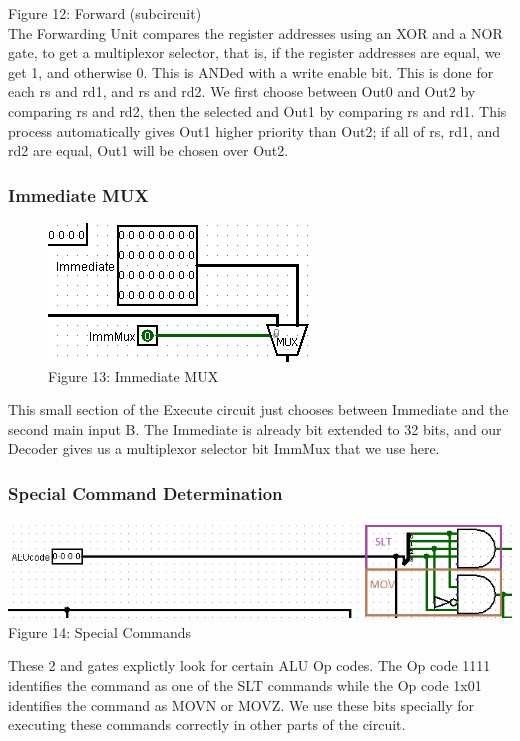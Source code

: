 \documentclass{article}
\begin{document}
\hspace{1.5cm}Figure 12: Forward (subcircuit) \\

\noindent The Forwarding Unit compares the register addresses using an XOR and a NOR gate, to get a multiplexor selector, that is, if the register addresses are equal, we get 1, and otherwise 0. This is ANDed with a write enable bit. This is done for each rs and rd1, and rs and rd2. We first choose between Out0 and Out2 by comparing rs and rd2, then the selected and Out1 by comparing rs and rd1. This process automatically gives Out1 higher priority than Out2; if all of rs, rd1, and rd2 are equal, Out1 will be chosen over Out2. 

\subsubsection{Immediate MUX}
\begin{figure}
\vspace{-1.8cm}
\begin{center}
\includegraphics[scale=0.8]{Immediate.png}\\
Figure 13: Immediate MUX
\end{center}
\vspace{-1cm}
\end{figure}
This small section of the Execute circuit just chooses between Immediate and the second main input B. The Immediate is already bit extended to 32 bits, and our Decoder gives us a multiplexor selector bit ImmMux that we use here. 


\subsubsection{Special Command Determination}
\begin{center}
\includegraphics[scale = 0.9]{Code.png} \\
Figure 14: Special Commands
\end{center}
These 2 and gates explictly look for certain ALU Op codes. The Op code 1111 identifies the command as one of the SLT commands while the Op code 1x01 identifies the command as MOVN or MOVZ. We use these bits specially for executing these commands correctly in other parts of the circuit.
\end{document}
